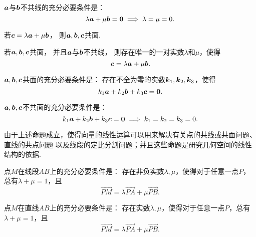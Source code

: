 \begin{corollary}\label{theorem:解析几何.两向量不共线的充分必要条件1}
\(\boldsymbol{a}\)与\(\boldsymbol{b}\)不共线的充分必要条件是：\[
	\lambda \boldsymbol{a} + \mu \boldsymbol{b} = \boldsymbol{0}
	\implies
	\lambda = \mu = 0.
\]
\end{corollary}

\begin{theorem}
若\(\boldsymbol{c} = \lambda \boldsymbol{a} + \mu \boldsymbol{b}\)，
则\(\boldsymbol{a},\boldsymbol{b},\boldsymbol{c}\)共面.
\end{theorem}

\begin{theorem}
若\(\boldsymbol{a},\boldsymbol{b},\boldsymbol{c}\)共面，
并且\(\boldsymbol{a}\)与\(\boldsymbol{b}\)不共线，
则存在唯一的一对实数\(\lambda\)和\(\mu\)，使得\[
\boldsymbol{c} = \lambda \boldsymbol{a} + \mu \boldsymbol{b}.
\]
\end{theorem}

\begin{theorem}\label{theorem:解析几何.三向量共面的充分必要条件1}
\(\boldsymbol{a},\boldsymbol{b},\boldsymbol{c}\)共面的充分必要条件是：
存在不全为零的实数\(\boldsymbol{k}_1,\boldsymbol{k}_2,\boldsymbol{k}_3\)，使得\[
	k_1 \boldsymbol{a} + k_2 \boldsymbol{b} + k_3 \boldsymbol{c} = \boldsymbol{0}.
\]
\end{theorem}

\begin{corollary}\label{theorem:解析几何.三向量不共面的充分必要条件1}
\(\boldsymbol{a},\boldsymbol{b},\boldsymbol{c}\)不共面的充分必要条件是：\[
	k_1 \boldsymbol{a} + k_2 \boldsymbol{b} + k_3 \boldsymbol{c} = \boldsymbol{0}
	\implies
	k_1 = k_2 = k_3 = 0.
\]
\end{corollary}

由于上述命题成立，使得向量的线性运算可以用来解决有关点的共线或共面问题、直线的共点问题
以及线段的定比分割问题；并且这些命题是研究几何空间的线性结构的依据.

\begin{theorem}
点\(M\)在线段\(AB\)上的充分必要条件是：
存在非负实数\(\lambda,\mu\)，使得对于任意一点\(P\)，总有\(\lambda+\mu=1\)，且\[
\vec{PM} = \lambda \vec{PA} + \mu \vec{PB}.
\]
\end{theorem}

\begin{theorem}
点\(M\)在直线\(AB\)上的充分必要条件是：
存在实数\(\lambda,\mu\)，使得对于任意一点\(P\)，总有\(\lambda+\mu=1\)，且\[
\vec{PM} = \lambda \vec{PA} + \mu \vec{PB}.
\]
\end{theorem}

